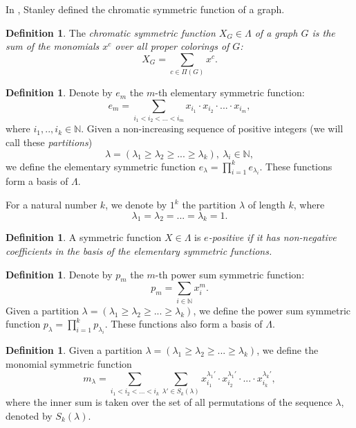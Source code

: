 \documentclass{article}
\theoremstyle{plain}
\theoremstyle{definition}
\newtheorem{defn}[thm]{Definition}
\begin{document}
In \cite{Stanley95a}, Stanley defined the chromatic symmetric function of a graph.

\begin{defn} \label{chromfunction} The \em chromatic symmetric
  function \normalfont $X_G\in\Lambda$ of a graph $G$ is the sum of the monomials $x^c$
  over all proper colorings of
  $G$: $$X_G=\sum\limits_{c\in\Pi(G)}x^c.$$
\end{defn} 


\begin{defn} \label{efunc} Denote by $e_m$ the $m$-th elementary
  symmetric function:
  $$e_m = \sum\limits_{i_1<i_2<...<i_m}x_{i_1}\cdot
  x_{i_2}\cdot...\cdot x_{i_m},$$
  where $i_1,..,i_k\in \mathbb{N}$.  Given a non-increasing sequence of
  positive integers (we will call these {\em partitions})
  $$\lambda = (\lambda_1\geq \lambda_2\geq...\geq\lambda_k),\ \lambda_i\in
  \mathbb{N},$$
  we define the elementary symmetric function
  $e_{\lambda} = \prod\limits_{i=1}^k e_{\lambda_i}.$ These functions
  form a basis of $\Lambda.$
\end{defn}
For a natural number $k$, we denote by $1^k$ the partition $\lambda$ of length $k$, where $$\lambda_1=\lambda_2=...=\lambda_k=1.$$

\begin{defn} \label{epos} A symmetric function $X\in \Lambda$ is \em
  $e$-positive \normalfont if it has non-negative coefficients in the
  basis of the elementary symmetric functions.
\end{defn}

\begin{defn} \label{pfunc} Denote by $p_m$ the $m$-th power sum
  symmetric function: $$p_m =
  \sum\limits_{i\in\mathbb{N}}x^m_{i}.$$ Given a
  partition $\lambda = (\lambda_1\geq \lambda_2\geq...\geq\lambda_k)$, we define the power sum
  symmetric function
  $p_{\lambda} = \prod\limits_{i=1}^k p_{\lambda_i}.$ These functions also
  form a basis of $\Lambda.$
\end{defn}

\begin{defn} \label{mfunc}
Given a partition $\lambda = (\lambda_1\geq \lambda_2\geq...\geq\lambda_k)$,  we define the monomial symmetric function $$m_\lambda=\sum\limits_{i_1<i_2<...<i_k}\sum\limits_{\lambda'\in S_k(\lambda)}x_{i_1}^{\lambda_{1}'}\cdot
  x_{i_2}^{\lambda_{1}'}\cdot...\cdot x_{i_k}^{\lambda_{k}'},$$
where the inner sum is taken over the set of all permutations of the sequence $\lambda$, denoted by $S_k(\lambda)$.
\end{defn}
\end{document}

